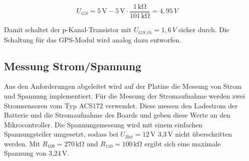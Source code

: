 \begin{minipage}{\textwidth}
\begin{equation}\label{eq:UGS}
{U_{GS}}{=} 5\,\si{\volt}-5\,\si{\volt}\cdot \frac{1\,\si{\kilo\ohm}}{101\,\si{\kilo\ohm}}{=}4,95\,V
\end{equation}
\end{minipage}

Damit schaltet der p-Kanal-Transistor mit $U_{GS,th}=1,6\,V$ sicher durch.
Die Schaltung für das GPS-Modul wird analog dazu entworfen.


\subsection{Messung Strom/Spannung}\label{subsec.MessungStromSpannung}
Aus den Anforderungen abgeleitet wird auf der Platine die Messung von Strom und Spannung implementiert. Für die Messung der Stromaufnahme werden zwei Stromsensoren vom Typ ACS172 verwendet. Diese messen den Ladestrom der Batterie und die Stromaufnahme des Boards und geben diese Werte an den Mikrocontroller.
Die Spannungsmessung wird mit einem einfachen Spannungsteiler umgesetzt, sodass bei $U_{Bat}=12\,\si{\volt}$ 3,3\,V nicht überschritten werden. Mit $R_{109}=270\,\si{\kilo\ohm}$ und $R_{110}=100\,\si{\kilo\ohm}$ ergibt sich eine maximale Spannung von 3,24\,V.





